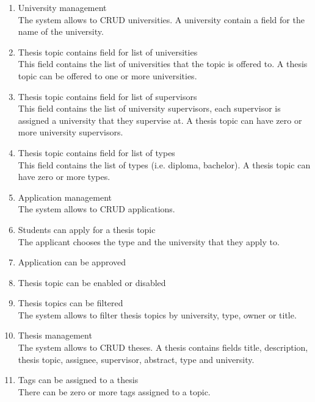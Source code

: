\begin{enumerate}
    \item University management\\
    The system allows to CRUD universities. A university contain a field for the name of the university.

    \item Thesis topic contains field for list of universities\\
    This field contains the list of universities that the topic is offered to. A thesis topic can be offered to one or more universities.

    \item Thesis topic contains field for list of supervisors\\
    This field contains the list of university supervisors, each supervisor is assigned a university that they supervise at. A thesis topic can have zero or more university supervisors.

    \item Thesis topic contains field for list of types\\
    This field contains the list of types (i.e. diploma, bachelor). A thesis topic can have zero or more types.

    \item Application management\\
    The system allows to CRUD applications.

    \item Students can apply for a thesis topic\\
    The applicant chooses the type and the university that they apply to.

    \item Application can be approved

    \item Thesis topic can be enabled or disabled

    \item Thesis topics can be filtered\\
    The system allows to filter thesis topics by university, type, owner or title.

    \item Thesis management\\
    The system allows to CRUD theses. A thesis contains fields title, description, thesis topic, assignee, supervisor, abstract, type and university.

    \item Tags can be assigned to a thesis\\
    There can be zero or more tags assigned to a topic.


\end{enumerate}
